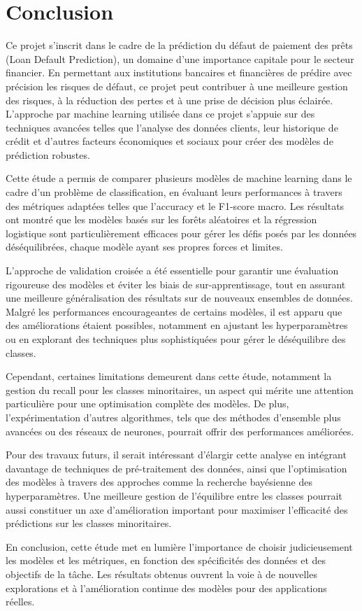 \clearpage
\chapter*{Conclusion}
\vspace{-1cm}
Ce projet s'inscrit dans le cadre de la prédiction du défaut de paiement des prêts (Loan Default Prediction), un domaine d'une importance capitale pour le secteur financier. En permettant aux institutions bancaires et financières de prédire avec précision les risques de défaut, ce projet peut contribuer à une meilleure gestion des risques, à la réduction des pertes et à une prise de décision plus éclairée. L'approche par machine learning utilisée dans ce projet s'appuie sur des techniques avancées telles que l'analyse des données clients, leur historique de crédit et d'autres facteurs économiques et sociaux pour créer des modèles de prédiction robustes.

Cette étude a permis de comparer plusieurs modèles de machine learning dans le cadre d'un problème de classification, en évaluant leurs performances à travers des métriques adaptées telles que l'accuracy et le F1-score macro. Les résultats ont montré que les modèles basés sur les forêts aléatoires et la régression logistique sont particulièrement efficaces pour gérer les défis posés par les données déséquilibrées, chaque modèle ayant ses propres forces et limites.

L'approche de validation croisée a été essentielle pour garantir une évaluation rigoureuse des modèles et éviter les biais de sur-apprentissage, tout en assurant une meilleure généralisation des résultats sur de nouveaux ensembles de données. Malgré les performances encourageantes de certains modèles, il est apparu que des améliorations étaient possibles, notamment en ajustant les hyperparamètres ou en explorant des techniques plus sophistiquées pour gérer le déséquilibre des classes.

Cependant, certaines limitations demeurent dans cette étude, notamment la gestion du recall pour les classes minoritaires, un aspect qui mérite une attention particulière pour une optimisation complète des modèles. De plus, l'expérimentation d'autres algorithmes, tels que des méthodes d'ensemble plus avancées ou des réseaux de neurones, pourrait offrir des performances améliorées.

Pour des travaux futurs, il serait intéressant d'élargir cette analyse en intégrant davantage de techniques de pré-traitement des données, ainsi que l'optimisation des modèles à travers des approches comme la recherche bayésienne des hyperparamètres. Une meilleure gestion de l'équilibre entre les classes pourrait aussi constituer un axe d'amélioration important pour maximiser l'efficacité des prédictions sur les classes minoritaires.

En conclusion, cette étude met en lumière l'importance de choisir judicieusement les modèles et les métriques, en fonction des spécificités des données et des objectifs de la tâche. Les résultats obtenus ouvrent la voie à de nouvelles explorations et à l'amélioration continue des modèles pour des applications réelles.

